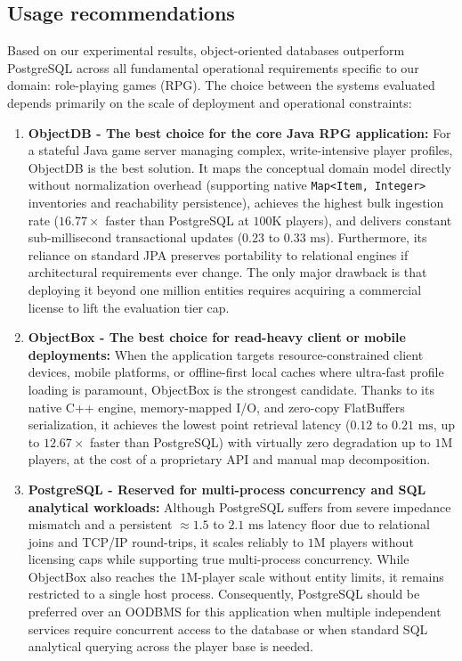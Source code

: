 \documentclass{article}
\begin{document}
\subsection{Usage recommendations}

Based on our experimental results, object-oriented databases outperform PostgreSQL across all fundamental operational requirements specific to our domain: role-playing games (RPG). The choice between the systems evaluated depends primarily on the scale of deployment and operational constraints:

\begin{enumerate}
    \item \textbf{ObjectDB - The best choice for the core Java RPG application:}
        For a stateful Java game server managing complex, write-intensive player profiles, ObjectDB is the best solution. It maps the conceptual domain model directly without normalization overhead (supporting native \texttt{Map<Item, Integer>} inventories and reachability persistence), achieves the highest bulk ingestion rate ($16.77\times$ faster than PostgreSQL at $100\text{K}$ players), and delivers constant sub-millisecond transactional updates ($0.23$ to $0.33\text{ ms}$). Furthermore, its reliance on standard JPA preserves portability to relational engines if architectural requirements ever change. The only major drawback is that deploying it beyond one million entities requires acquiring a commercial license to lift the evaluation tier cap.

    \item \textbf{ObjectBox - The best choice for read-heavy client or mobile deployments:}
        When the application targets resource-constrained client devices, mobile platforms, or offline-first local caches where ultra-fast profile loading is paramount, ObjectBox is the strongest candidate. Thanks to its native C++ engine, memory-mapped I/O, and zero-copy FlatBuffers serialization, it achieves the lowest point retrieval latency ($0.12$ to $0.21\text{ ms}$, up to $12.67\times$ faster than PostgreSQL) with virtually zero degradation up to $1\text{M}$ players, at the cost of a proprietary API and manual map decomposition.

    \item \textbf{PostgreSQL - Reserved for multi-process concurrency and SQL analytical workloads:}
        Although PostgreSQL suffers from severe impedance mismatch and a persistent $\approx 1.5$ to $2.1\text{ ms}$ latency floor due to relational joins and TCP/IP round-trips, it scales reliably to $1\text{M}$ players without licensing caps while supporting true multi-process concurrency. While ObjectBox also reaches the $1\text{M}$-player scale without entity limits, it remains restricted to a single host process. Consequently, PostgreSQL should be preferred over an OODBMS for this application when multiple independent services require concurrent access to the database or when standard SQL analytical querying across the player base is needed.
\end{enumerate}
\end{document}
